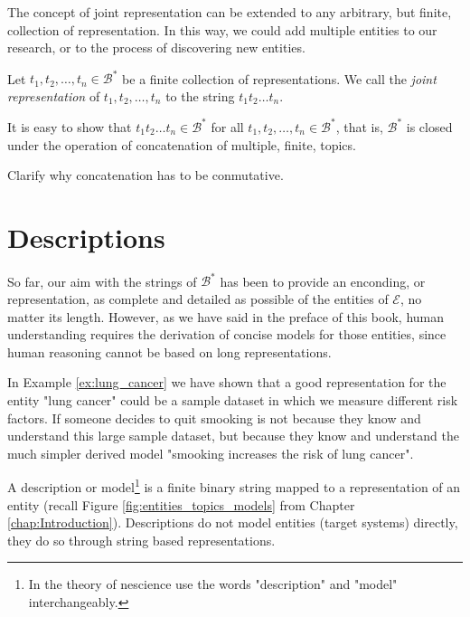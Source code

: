 The concept of joint representation can be extended to any arbitrary, but finite, collection of representation. In this way, we could add multiple entities to our research, or to the process of discovering new entities.

\begin{definition}
Let $t_1, t_2, \ldots, t_n \in \mathcal{B}^\ast$ be a finite collection of representations. We call the \emph{joint representation} of $t_1, t_2, \ldots, t_n$ to the string $t_1 t_2 \ldots t_n$.
\end{definition}

It is easy to show that $t_1 t_2 \ldots t_n \in \mathcal{B}^\ast$ for all $t_1, t_2, \ldots, t_n \in \mathcal{B}^\ast$, that is, $\mathcal{B}^\ast$ is closed under the operation of concatenation of multiple, finite, topics.

{\color{red} Clarify why concatenation has to be conmutative.}


%
%

\section{Descriptions}
\label{sec:descriptions_models}

So far, our aim with the strings of $\mathcal{B}^\ast$ has been to provide an enconding, or representation, as complete and detailed as possible of the entities of $\mathcal{E}$, no matter its length. However, as we have said in the preface of this book, human understanding requires the derivation of concise models for those entities, since human reasoning cannot be based on long representations.

\begin{example}
In Example \ref{ex:lung_cancer} we have shown that a good representation for the entity "lung cancer" could be a sample dataset in which we measure different risk factors. If someone decides to quit smooking is not because they know and understand this large sample dataset, but because they know and understand the much simpler derived model "smooking increases the risk of lung cancer".
\end{example}

A description or model\footnote{In the theory of nescience use the words "description" and "model" interchangeably.} is a finite binary string mapped to a representation of an entity (recall Figure \ref{fig:entities_topics_models} from Chapter \ref{chap:Introduction}). Descriptions do not model entities (target systems) directly, they do so through string based representations.

